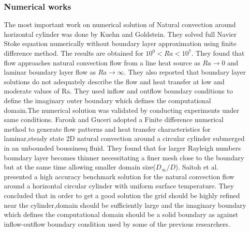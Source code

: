 \subsubsection{Numerical works}
\hspace{1cm}The most important work on numerical solution of Natural convection around horizontal cylinder was done by Kuehn and Goldstein\cite{kuehn}. They solved full Navier Stoke equation numerically without boundary layer approximation using finite difference method. The results are obtained for $10^{0}<Ra<10^{7}$. They found that flow approaches natural convection flow from a line heat source as $Ra\rightarrow0$ and laminar boundary layer flow as $Ra\rightarrow\infty$. They also reported that boundary layer solutions do not adequately describe the flow and heat transfer at low and moderate values of Ra. They used inflow and outflow boundary conditions to define the imaginary outer boundary which defines the computational domain.The numerical solution was validated by conducting experiments under same conditions. Farouk and Guceri\cite{farouk} adopted a Finite difference numerical  method to generate flow patterns and heat transfer characteristics for laminar,steady state 2D natural convection around a circular cylinder submerged in an unbounded boussinesq fluid. They found that for larger Rayleigh numbers boundary layer becomes thinner necessitating a finer mesh close to the boundary but at the same time allowing smaller domain size($D_{\infty}/D$). Saitoh et al.\cite{saitoh} presented a high accuracy benchmark solution for the natural convection flow around a horizontal circular cylinder with uniform surface temperature. They concluded that in order to get a good solution the grid should be highly refined near the cylinder,domain should be sufficiently large and the  imaginary boundary which defines the computational domain should be a solid boundary as against inflow-outflow boundary condition used by some of the previous researchers.

